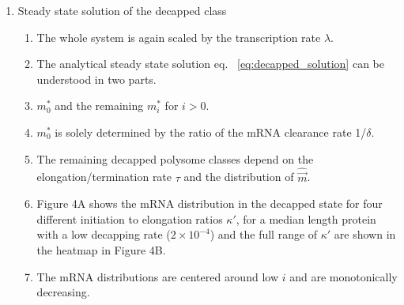 \documentclass[review]{elsarticle}
\newcommand{\mvec}{\ensuremath{\vec{m}}\xspace}
\newcommand{\mvechat}{\ensuremath{\hat{\mvec}}\xspace}
\begin{document}
\begin{enumerate}
\begin{enumerate}
  \item  Steady state solution of the decapped class
  \begin{enumerate}
    \item The whole system is again scaled by the transcription rate $\lambda$.
    \item  The analytical steady state solution eq. ~\ref{eq:decapped_solution} can be understood in two parts. 
    \item $m_0^*$ and the remaining $m_i^*$ for $i>0$.
    \item $m_0^*$ is solely determined by the ratio of the mRNA clearance rate 1/$\delta$.
    \item The remaining decapped polysome classes depend on the elongation/termination rate $\tau$ and the distribution of \mvechat.
    \item  Figure 4A shows the mRNA distribution in the decapped state for four different initiation to elongation ratios $\kappa'$, for a median length protein with a low decapping rate ($2\times10^{-4}$) and the full range of $\kappa'$ are shown in the heatmap in Figure 4B.
     \item The mRNA distributions are centered around low $i$ and are monotonically decreasing. 
  \end{enumerate}	


\end{enumerate}
\end{enumerate}
\end{document}
